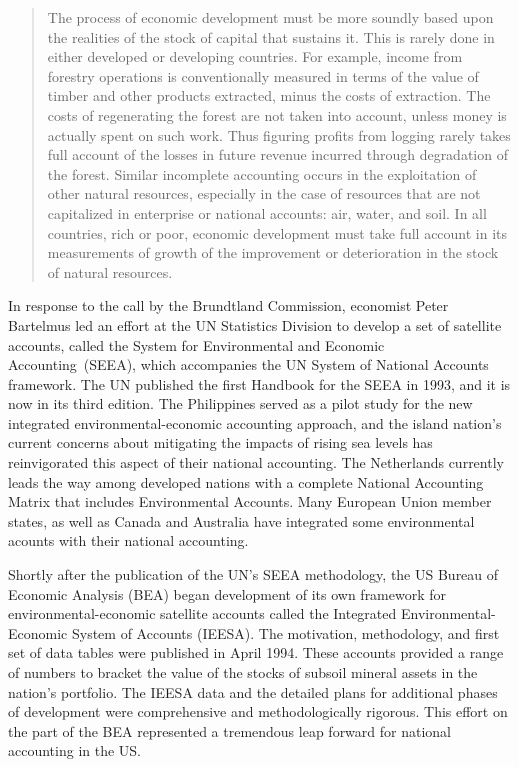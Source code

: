 \begin{quote}
	The process of economic development must be more soundly 
	based upon the realities of the stock of capital that sustains it. 
	This is rarely done in either developed or developing countries. 
	For example, income from forestry operations is conventionally measured 
	in terms of the value of timber and other products extracted, 
	minus the costs of extraction. 
	The costs of regenerating the forest are not taken into account, 
	unless money is actually spent on such work. 
	Thus figuring profits from logging rarely takes full account 
	of the losses in future revenue incurred through degradation of the forest. 
	Similar incomplete accounting occurs in the exploitation 
	of other natural resources, 
	especially in the case of resources that are not capitalized 
	in enterprise or national accounts: air, water, and soil. 
	In all countries, rich or poor, 
	economic development must take full account 
	in its measurements of growth of the improvement or 
	deterioration in the stock 
	of natural resources.\cite[Chapter~2, Paragraph~36]{brundtland1987}
\end{quote}

In response to the call by the Brundtland Commission, 
economist Peter Bartelmus led an effort at the UN Statistics Division 
to develop a set of satellite accounts, 
called the System for Environmental and Economic Accounting~(SEEA),
which accompanies the UN System of National Accounts framework.\cite{bartelmus_integrated_1991}
The UN published the first Handbook for the SEEA in 1993,
and it is now in its third edition.\cite{UNSEEA1993} 
The Philippines served as a pilot study for the new integrated environmental-economic
accounting approach, and the island nation's current concerns about mitigating the impacts of 
rising sea levels has reinvigorated this aspect 
of their national accounting.\cite{uno1998, PhilippinesSEEAWeb}
The Netherlands currently leads the way 
among developed nations with a complete  National Accounting Matrix that 
includes Environmental Accounts.\cite{DutchStats2009}
Many European Union member states, 
as well as Canada and Australia have integrated 
some environmental acounts with their national accounting.\cite{UNSEEAWeb} 

Shortly after the publication 
of the UN's SEEA methodology,
the US Bureau of Economic Analysis (BEA) began development of its own
framework for environmental-economic satellite accounts called the 
Integrated Environmental-Economic System of Accounts (IEESA). 
The motivation, methodology, and first set of data tables were published 
in April 1994.\cite{BEA1994a} 
These accounts provided a range of numbers to bracket the value
of the stocks of subsoil mineral assets in the nation's portfolio. 
The IEESA data and the detailed plans for additional phases 
of development were comprehensive and methodologically rigorous. 
This effort on the part of the BEA
represented a tremendous leap forward for 
national accounting in the US\@.

